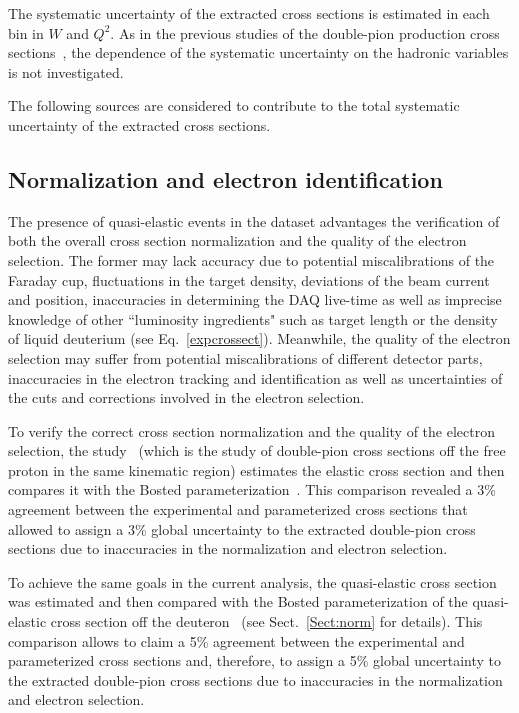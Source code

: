 The systematic uncertainty of the extracted cross sections is estimated in each bin in $W$ and $Q^{2}$. As in the previous studies of the double-pion production cross sections~\cite{Rip_an_note:2002,Ripani:2002ss,Fed_an_note:2007,Fedotov:2008aa,Isupov:2017lnd,Arjun,Fed_an_note:2017,Fed_paper_2018}, the dependence of the systematic uncertainty on the hadronic variables is not investigated. 


The following sources are considered to contribute to the total systematic uncertainty of the extracted cross sections.


\subsection*{Normalization and electron identification}

The presence of quasi-elastic events in the dataset advantages the verification of both the overall cross section normalization and the quality of the electron selection. The former may lack accuracy due to potential miscalibrations of the Faraday cup, fluctuations in the target density, deviations of the beam current and position, inaccuracies in determining the DAQ live-time as well as imprecise knowledge of other ``luminosity ingredients" such as target length or the density of liquid deuterium (see Eq.~\eqref{expcrossect}). Meanwhile, the quality of the electron selection may suffer from potential miscalibrations of different detector parts, inaccuracies in the electron tracking and identification as well as uncertainties of the cuts and corrections involved in the electron selection.

To verify the correct cross section normalization and the quality of the electron selection, the study~\cite{Fed_an_note:2017,Fed_paper_2018} (which is the study of double-pion cross sections off the free proton in the same kinematic region) estimates the elastic cross section and then compares it with the Bosted parameterization~\cite{Bosted:1994tm}. This comparison revealed a 3\% agreement between the experimental and parameterized cross sections that allowed to assign a 3\% global uncertainty to the extracted double-pion cross sections due to inaccuracies in the normalization and electron selection.

To achieve the same goals in the current analysis, the quasi-elastic cross section was estimated and then compared with the Bosted  parameterization of the quasi-elastic cross section off the deuteron~\cite{Bosted_fit,Bosted:2007xd} (see Sect.~\ref{Sect:norm} for details). This comparison allows to claim a 5\% agreement between the experimental and parameterized cross sections and, therefore, to assign a 5\% global uncertainty to the extracted double-pion cross sections due to inaccuracies in the normalization and electron selection.



